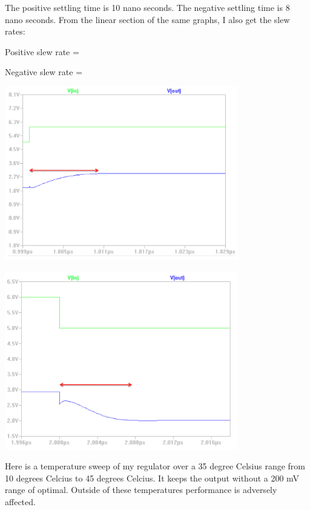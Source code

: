 \documentclass[10pt]{amsart}
\begin{document}
\newpage

The positive settling time is 10 nano seconds. The negative settling time is 8 nano seconds. From the linear section of the same graphs, I also get the slew rates:

Positive slew rate = 

Negative slew rate = 

	\begin{center}
		\includegraphics[width=4in]{Media/pos.png}
	\end{center}

	\begin{center}
		\includegraphics[width=4.0in]{Media/neg.png}
	\end{center}

Here is a temperature sweep of my regulator over a 35 degree Celsius range from 10 degrees Celcius to 45 degrees Celcius. It keeps the output without a 200 mV range of optimal. Outside of these temperatures performance is adversely affected.
\end{document}
